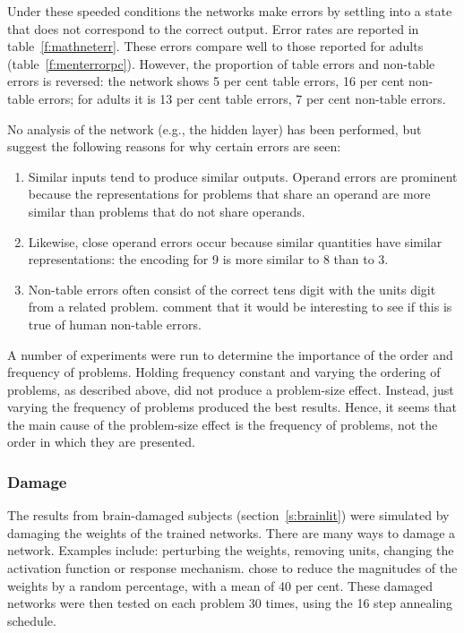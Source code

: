 Under these speeded conditions the networks make errors by settling into a
state that does not correspond to the correct output. Error rates are
reported in table~\ref{f:mathneterr}.
These errors compare well to those reported for adults
(table~\ref{f:menterrorpc}). However, the proportion of table errors and
non-table errors is reversed: the network shows 5 per cent table
errors, 16 per cent non-table errors; for adults it is 13 per cent table
errors, 7 per cent non-table errors.


No analysis of the network (e.g., the hidden layer) has been performed, but
\citeauthor{mcclmath} suggest the following reasons for why certain
errors
are seen:
\begin{enumerate}

\item Similar inputs tend to produce similar outputs. Operand
errors are prominent because the representations for problems
that share an operand are more similar than problems that do not share
operands.

\item Likewise, close operand errors occur because similar quantities have
similar representations: the encoding for 9 is more similar to 8 than to
3.

\item Non-table errors often consist of the correct tens digit with the
units digit from a related problem.  \citeauthor{mcclmath} comment that it
would be interesting to see if this is true of human non-table errors.
\end{enumerate}

A number of experiments were run to determine the importance of the
order and frequency of problems. Holding frequency constant and varying the
ordering of problems, as described above, did not produce a problem-size
effect. Instead, just varying the frequency of problems produced
the best results.  Hence, it seems that the main cause of the
problem-size effect is the frequency of problems, not the order in
which they
are
presented.


\subsubsection{Damage}


The results from brain-damaged subjects (section~\ref{s:brainlit}) were
simulated by damaging the weights of the trained networks.  There are many
ways to damage a network. Examples include: perturbing
the weights, removing units, changing
the activation function or response mechanism.  \citeauthor{mcclmath}
chose to reduce the magnitudes of the weights by a
random percentage, with a
mean of 40 per cent. These damaged networks were then tested on each
problem 30
times, using the 16 step annealing schedule.

